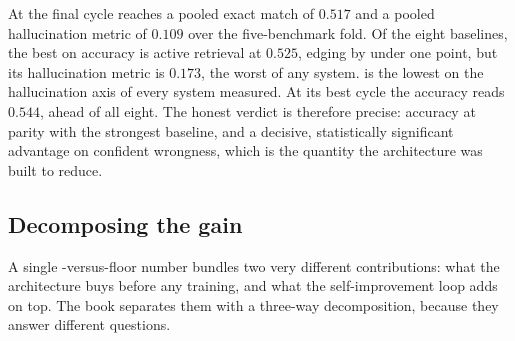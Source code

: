 \begin{bythenumbers}
At the final cycle \caem{} reaches a pooled exact match of $0.517$ and a pooled
hallucination metric of $0.109$ over the five-benchmark fold. Of the eight baselines,
the best on accuracy is active retrieval at $0.525$, edging \caem{} by under one
point, but its hallucination metric is $0.173$, the worst of any system. \caem{} is
the lowest on the hallucination axis of every system measured. At its best cycle the
accuracy reads $0.544$, ahead of all eight. The honest verdict is therefore precise:
accuracy at parity with the strongest baseline, and a decisive, statistically
significant advantage on confident wrongness, which is the quantity the architecture
was built to reduce.
\end{bythenumbers}

\subsection*{Decomposing the gain}

A single \caem{}-versus-floor number bundles two very different contributions: what
the architecture buys before any training, and what the self-improvement loop adds on
top. The book separates them with a three-way decomposition, because they answer
different questions.

